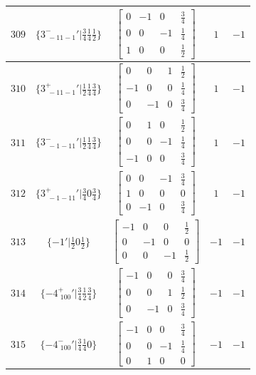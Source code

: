 \documentclass[fleqn,8pt]{jsarticle}
\begin{document}
\begin{longtable}{ccccc}
$ 309 $ & $ \{3^{-}_{\,\,-11-1}{}'|\frac{3}{4} \frac{1}{4} \frac{1}{2}\} $ & $ \begin{bmatrix} 0 & -1 & 0 & \frac{3}{4} \\ 0 & 0 & -1 & \frac{1}{4} \\ 1 & 0 & 0 & \frac{1}{2} \end{bmatrix} $ & $ 1 $ & $ -1 $ \\ \hline
$ 310 $ & $ \{3^{+}_{\,\,-11-1}{}'|\frac{1}{2} \frac{1}{4} \frac{3}{4}\} $ & $ \begin{bmatrix} 0 & 0 & 1 & \frac{1}{2} \\ -1 & 0 & 0 & \frac{1}{4} \\ 0 & -1 & 0 & \frac{3}{4} \end{bmatrix} $ & $ 1 $ & $ -1 $ \\ \hline
$ 311 $ & $ \{3^{-}_{\,\,-1-11}{}'|\frac{1}{2} \frac{1}{4} \frac{3}{4}\} $ & $ \begin{bmatrix} 0 & 1 & 0 & \frac{1}{2} \\ 0 & 0 & -1 & \frac{1}{4} \\ -1 & 0 & 0 & \frac{3}{4} \end{bmatrix} $ & $ 1 $ & $ -1 $ \\ \hline
$ 312 $ & $ \{3^{+}_{\,\,-1-11}{}'|\frac{3}{4} 0 \frac{3}{4}\} $ & $ \begin{bmatrix} 0 & 0 & -1 & \frac{3}{4} \\ 1 & 0 & 0 & 0 \\ 0 & -1 & 0 & \frac{3}{4} \end{bmatrix} $ & $ 1 $ & $ -1 $ \\ \hline
$ 313 $ & $ \{-1{}'|\frac{1}{2} 0 \frac{1}{2}\} $ & $ \begin{bmatrix} -1 & 0 & 0 & \frac{1}{2} \\ 0 & -1 & 0 & 0 \\ 0 & 0 & -1 & \frac{1}{2} \end{bmatrix} $ & $ -1 $ & $ -1 $ \\ \hline
$ 314 $ & $ \{-4^{+}_{\,\,100}{}'|\frac{3}{4} \frac{1}{2} \frac{3}{4}\} $ & $ \begin{bmatrix} -1 & 0 & 0 & \frac{3}{4} \\ 0 & 0 & 1 & \frac{1}{2} \\ 0 & -1 & 0 & \frac{3}{4} \end{bmatrix} $ & $ -1 $ & $ -1 $ \\ \hline
$ 315 $ & $ \{-4^{-}_{\,\,100}{}'|\frac{3}{4} \frac{1}{4} 0\} $ & $ \begin{bmatrix} -1 & 0 & 0 & \frac{3}{4} \\ 0 & 0 & -1 & \frac{1}{4} \\ 0 & 1 & 0 & 0 \end{bmatrix} $ & $ -1 $ & $ -1 $ \\ \hline

\end{longtable}
\end{document}
